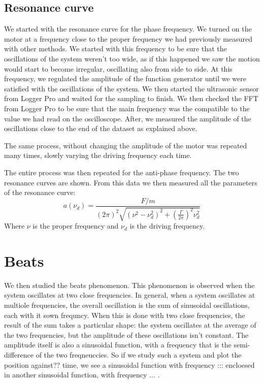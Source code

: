 \documentclass{article}
\begin{document}
\subsection{Resonance curve}
We started with the resonance curve for the phase frequency. We turned on the motor at a frequency close to the proper frequency we had previously measured with other methods. We started with this frequency to be sure that the oscillations of the system weren't too wide, as if this happened we saw the motion would start to become irregular, oscillating also from side to side. At this frequency, we regulated the amplitude of the function generator until we were satisfied with the oscillations of the system. We then started the ultrasonic sensor from Logger Pro and waited for the sampling to finish. We then checked the FFT from Logger Pro to be sure that the main frequency was the compatible to the value we had read on the oscilloscope. After, we measured the amplitude of the oscillations close to the end of the dataset as explained above. 

The same process, without changing the amplitude of the motor was repeated many times, slowly varying the driving frequency each time. 

The entire process was then repeated for the anti-phase frequency. The two resonance curves are shown. 
From this data we then measured all the parameters of the resonance curve: 
\begin{equation}
    a (\nu_d) = \frac{F/m}{  (2\pi)^2
                \sqrt{( \nu^2 - \nu_d^2 )^2 +
                \left ( \frac{\Gamma}{2\pi} \right )^2 \nu_d^2}}
\end{equation}  
Where $\nu$ is the proper frequency and $\nu_d$ is the driving frequency.

\section{Beats}
We then studied the beats phenomenon. This phenomenon is observed when the system oscillates at two close frequencies. In general, when a system oscillates at multiole frequencies, the overall oscillation is the sum of sinusoidal oscillations, each with it sown frequncy. When this is done with two close frequencies, the result of the sum takes a particular shape: the system oscillates at the average of the two frequencies, but the amplitude of these oscillations isn't constant. The amplitude itself is also a sinusoidal function, with a frequency that is the semi-difference of the two freqneuccies. So if we study such a system and plot the position against?? time, we see a sinusoidal function with frequency ::: encloesed in another sinusoidal function, with frequency ... . 
\end{document}
